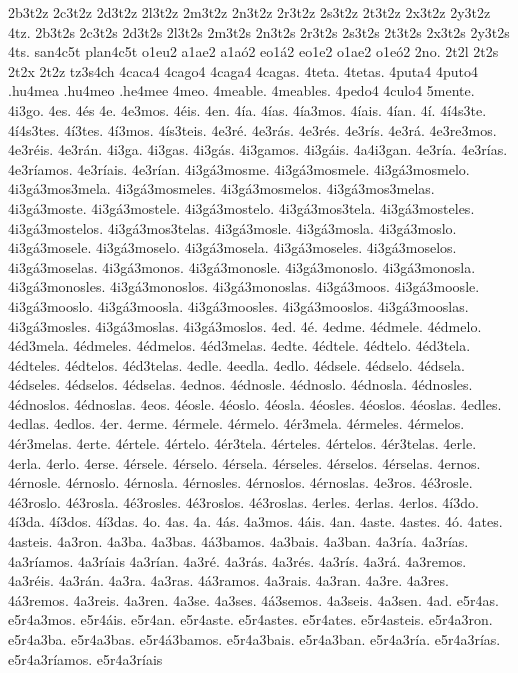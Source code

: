 {2b3t2z 2c3t2z 2d3t2z 2l3t2z 2m3t2z 2n3t2z 2r3t2z 2s3t2z 2t3t2z 2x3t2z 2y3t2z 4tz.
2b3t2s 2c3t2s 2d3t2s 2l3t2s 2m3t2s 2n3t2s 2r3t2s 2s3t2s 2t3t2s 2x3t2s 2y3t2s 4ts.
san4c5t
plan4c5t
o1eu2
a1ae2
a1aó2
eo1á2
eo1e2
o1ae2
o1eó2
2no.
2t2l
2t2s
2t2x
2t2z
tz3s4ch
4caca4
4cago4
4caga4
4cagas.
4teta.
4tetas.
4puta4
4puto4
.hu4mea
.hu4meo
.he4mee
4meo.
4meable.
4meables.
4pedo4
4culo4
5mente.
4i3go.
4es.
4és
4e.
4e3mos.
4éis.
4en.
4ía.
4ías.
4ía3mos.
4íais.
4ían.
4í.
4í4s3te.
4í4s3tes.
4í3tes.
4í3mos.
4ís3teis.
4e3ré.
4e3rás.
4e3rés.
4e3rís.
4e3rá.
4e3re3mos.
4e3réis.
4e3rán.
4i3ga.
4i3gas.
4i3gás.
4i3gamos.
4i3gáis.
4a4i3gan.
4e3ría.
4e3rías.
4e3ríamos.
4e3ríais.
4e3rían.
4i3gá3mosme.
4i3gá3mosmele.
4i3gá3mosmelo.
4i3gá3mos3mela.
4i3gá3mosmeles.
4i3gá3mosmelos.
4i3gá3mos3melas.
4i3gá3moste.
4i3gá3mostele.
4i3gá3mostelo.
4i3gá3mos3tela.
4i3gá3mosteles.
4i3gá3mostelos.
4i3gá3mos3telas.
4i3gá3mosle.
4i3gá3mosla.
4i3gá3moslo.
4i3gá3mosele.
4i3gá3moselo.
4i3gá3mosela.
4i3gá3moseles.
4i3gá3moselos.
4i3gá3moselas.
4i3gá3monos.
4i3gá3monosle.
4i3gá3monoslo.
4i3gá3monosla.
4i3gá3monosles.
4i3gá3monoslos.
4i3gá3monoslas.
4i3gá3moos.
4i3gá3moosle.
4i3gá3mooslo.
4i3gá3moosla.
4i3gá3moosles.
4i3gá3mooslos.
4i3gá3mooslas.
4i3gá3mosles.
4i3gá3moslas.
4i3gá3moslos.
4ed.
4é.
4edme.
4édmele.
4édmelo.
4éd3mela.
4édmeles.
4édmelos.
4éd3melas.
4edte.
4édtele.
4édtelo.
4éd3tela.
4édteles.
4édtelos.
4éd3telas.
4edle.
4eedla.
4edlo.
4édsele.
4édselo.
4édsela.
4édseles.
4édselos.
4édselas.
4ednos.
4édnosle.
4édnoslo.
4édnosla.
4édnosles.
4édnoslos.
4édnoslas.
4eos.
4éosle.
4éoslo.
4éosla.
4éosles.
4éoslos.
4éoslas.
4edles.
4edlas.
4edlos.
4er.
4erme.
4érmele.
4érmelo.
4ér3mela.
4érmeles.
4érmelos.
4ér3melas.
4erte.
4értele.
4értelo.
4ér3tela.
4érteles.
4értelos.
4ér3telas.
4erle.
4erla.
4erlo.
4erse.
4érsele.
4érselo.
4érsela.
4érseles.
4érselos.
4érselas.
4ernos.
4érnosle.
4érnoslo.
4érnosla.
4érnosles.
4érnoslos.
4érnoslas.
4e3ros.
4é3rosle.
4é3roslo.
4é3rosla.
4é3rosles.
4é3roslos.
4é3roslas.
4erles.
4erlas.
4erlos.
4í3do.
4í3da.
4í3dos.
4í3das.
4o.
4as.
4a.
4ás.
4a3mos.
4áis.
4an.
4aste.
4astes.
4ó.
4ates.
4asteis.
4a3ron.
4a3ba.
4a3bas.
4á3bamos.
4a3bais.
4a3ban.
4a3ría.
4a3rías.
4a3ríamos.
4a3ríais
4a3rían.
4a3ré.
4a3rás.
4a3rés.
4a3rís.
4a3rá.
4a3remos.
4a3réis.
4a3rán.
4a3ra.
4a3ras.
4á3ramos.
4a3rais.
4a3ran.
4a3re.
4a3res.
4á3remos.
4a3reis.
4a3ren.
4a3se.
4a3ses.
4á3semos.
4a3seis.
4a3sen.
4ad.
e5r4as.
e5r4a3mos.
e5r4áis.
e5r4an.
e5r4aste.
e5r4astes.
e5r4ates.
e5r4asteis.
e5r4a3ron.
e5r4a3ba.
e5r4a3bas.
e5r4á3bamos.
e5r4a3bais.
e5r4a3ban.
e5r4a3ría.
e5r4a3rías.
e5r4a3ríamos.
e5r4a3ríais
}
